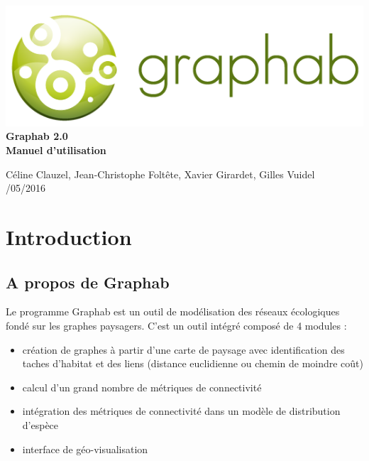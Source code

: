 \documentclass{article}
\begin{document}
 \begin{titlepage}
	
	\centering
	\includegraphics[scale=0.5]{img/logo.png}\\
	
	\bigskip
	\bigskip
	\bigskip	
	{\Huge
		\bfseries
		Graphab 2.0\\
		\bigskip
		Manuel d’utilisation\\
	}
	\bigskip
	\bigskip
	\bigskip
	\bigskip
	\bigskip
	
	{\Large		
		Céline Clauzel, Jean-Christophe Foltête, Xavier Girardet, Gilles Vuidel\\
		/05/2016\\
	}
	
\end{titlepage}

\setcounter{tocdepth}{2}
\tableofcontents

\pagebreak

\section{Introduction}

\subsection{A propos de Graphab}

Le programme Graphab est un outil de modélisation des réseaux écologiques fondé sur les graphes paysagers. C'est un outil intégré composé de 4 modules : 
\begin{itemize}
	\item création de graphes à partir d'une carte de paysage avec identification des taches d'habitat et des liens (distance euclidienne ou chemin de moindre coût)
	\item calcul d'un grand nombre de métriques de connectivité
	\item intégration des métriques de connectivité dans un modèle de distribution d’espèce
	\item interface de géo-visualisation
\end{itemize}
\end{document}
